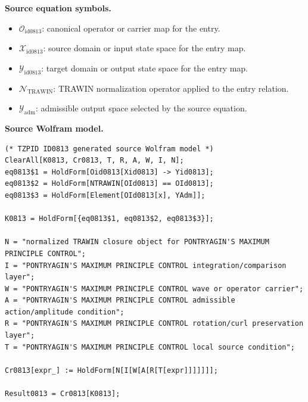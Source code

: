 \begin{minipage}[t]{0.49\linewidth}
\begingroup
\small
\raggedright
\textbf{Source equation symbols.}\par
\begin{itemize}[leftmargin=1.35em,itemsep=1pt,topsep=1pt,parsep=0pt]
    \item $\mathcal{O}_{\mathrm{id0813}}$: canonical operator or carrier map for the entry.
    \item $\mathcal{X}_{\mathrm{id0813}}$: source domain or input state space for the entry map.
    \item $\mathcal{Y}_{\mathrm{id0813}}$: target domain or output state space for the entry map.
    \item $\mathcal{N}_{\mathrm{TRAWIN}}$: TRAWIN normalization operator applied to the entry relation.
    \item $\mathcal{Y}_{\mathrm{adm}}$: admissible output space selected by the source equation.
\end{itemize}
\endgroup
\end{minipage}\hfill
\begin{minipage}[t]{0.47\linewidth}
\begingroup
\scriptsize
\raggedright
\textbf{Source Wolfram model.}\par
\begin{Verbatim}[fontsize=\tiny,breaklines=true,breakanywhere=true]
(* TZPID ID0813 generated source Wolfram model *)
ClearAll[K0813, Cr0813, T, R, A, W, I, N];
eq0813$1 = HoldForm[Oid0813[Xid0813] -> Yid0813];
eq0813$2 = HoldForm[NTRAWIN[OId0813] == OId0813];
eq0813$3 = HoldForm[Element[OId0813[x], YAdm]];

K0813 = HoldForm[{eq0813$1, eq0813$2, eq0813$3}];

N = "normalized TRAWIN closure object for PONTRYAGIN'S MAXIMUM PRINCIPLE CONTROL";
I = "PONTRYAGIN'S MAXIMUM PRINCIPLE CONTROL integration/comparison layer";
W = "PONTRYAGIN'S MAXIMUM PRINCIPLE CONTROL wave or operator carrier";
A = "PONTRYAGIN'S MAXIMUM PRINCIPLE CONTROL admissible action/amplitude condition";
R = "PONTRYAGIN'S MAXIMUM PRINCIPLE CONTROL rotation/curl preservation layer";
T = "PONTRYAGIN'S MAXIMUM PRINCIPLE CONTROL local source condition";

Cr0813[expr_] := HoldForm[N[I[W[A[R[T[expr]]]]]]];

Result0813 = Cr0813[K0813];
\end{Verbatim}
\endgroup
\end{minipage}

